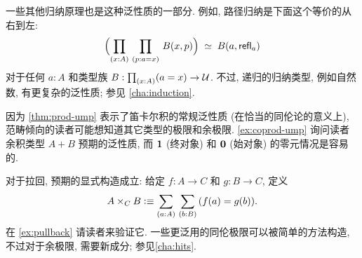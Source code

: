 一些其他归纳原理也是这种泛性质的一部分.
例如, 路径归纳是下面这个等价的从右到左:
%
%
\begin{equation}
    \label{eq:path-lump}
    \eqvspaced{\Parens{\prd{x:A}{p:a=x} B(x,p)}}{B(a,\refl a)}
\end{equation}
对于任何 $a:A$ 和类型族 $B:\prd{x:A} (a=x) \to\type$.
不过, 递归的归纳类型, 例如自然数, 有更复杂的泛性质; 参见 \cref{cha:induction}.

%
%
%
%
因为 \cref{thm:prod-ump} 表示了笛卡尔积的常规泛性质 (在恰当的同伦论的意义上), 范畴倾向的读者可能想知道其它类型的极限和余极限.
\cref{ex:coprod-ump} 询问读者余积类型 $A+B$ 预期的泛性质, 而 $\mathbf{1}$ (终对象) 和 $\mathbf{0}$ (始对象) 的零元情况是容易的.
%
%
%
%

%
对于拉回, 预期的显式构造成立: 给定 $f:A\to C$ 和 $g:B\to C$, 定义
\begin{equation}
    A\times_C B \defeq \sm{a:A}{b:B} (f(a)=g(b)).\label{eq:defn-pullback}
\end{equation}
在 \cref{ex:pullback} 请读者来验证它.
一些更泛用的同伦极限可以被简单的方法构造, 不过对于余极限, 需要新成分; 参见\cref{cha:hits}.

%
